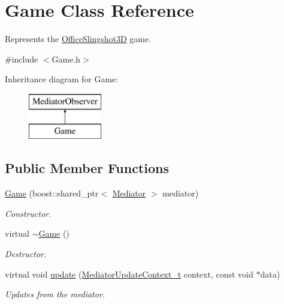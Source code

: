\hypertarget{classGame}{
\section{Game Class Reference}
\label{classGame}
}


Represents the \hyperlink{classOfficeSlingshot3D}{OfficeSlingshot3D} game.  




{\ttfamily \#include $<$Game.h$>$}

Inheritance diagram for Game:\begin{figure}[H]
\begin{center}
\leavevmode
\includegraphics[height=2.000000cm]{classGame}
\end{center}
\end{figure}
\subsection*{Public Member Functions}
\begin{DoxyCompactItemize}
\item 
\hypertarget{classGame_ae4a3e825c02c218e3a110586dbc964f5}{
\hyperlink{classGame_ae4a3e825c02c218e3a110586dbc964f5}{Game} (boost::shared\_\-ptr$<$ \hyperlink{classMediator}{Mediator} $>$ mediator)}
\label{classGame_ae4a3e825c02c218e3a110586dbc964f5}

\begin{DoxyCompactList}\small\item\em Constructor. \item\end{DoxyCompactList}\item 
\hypertarget{classGame_ae3d112ca6e0e55150d2fdbc704474530}{
virtual \hyperlink{classGame_ae3d112ca6e0e55150d2fdbc704474530}{$\sim$Game} ()}
\label{classGame_ae3d112ca6e0e55150d2fdbc704474530}

\begin{DoxyCompactList}\small\item\em Destructor. \item\end{DoxyCompactList}\item 
\hypertarget{classGame_a1e83402bc85f4ef4150bee568e4f8986}{
virtual void \hyperlink{classGame_a1e83402bc85f4ef4150bee568e4f8986}{update} (\hyperlink{namespaceMediatorUpdateContext_aa3a9bed543f2a2237dc2b6feea170a1d}{MediatorUpdateContext\_\-t} context, const void $\ast$data)}
\label{classGame_a1e83402bc85f4ef4150bee568e4f8986}

\begin{DoxyCompactList}\small\item\em Updates from the mediator. \item\end{DoxyCompactList}\end{DoxyCompactItemize}



